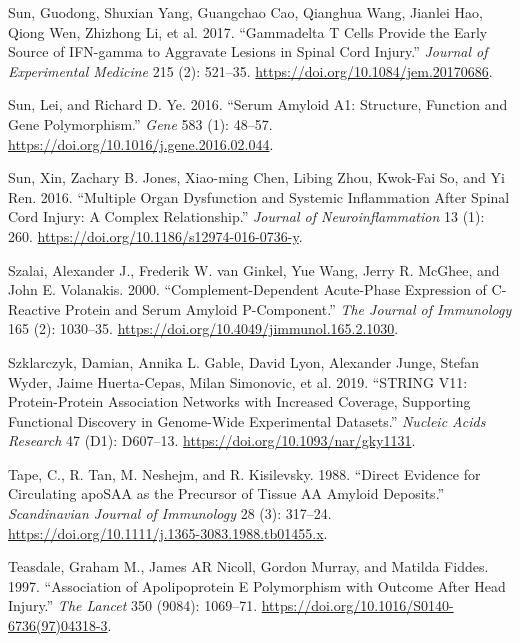 \documentclass[9pt,lineno]{elife}
\newlength{\cslhangindent}
\newlength{\cslentryspacingunit} %
\newenvironment{CSLReferences}[2] %
 {%
  \setlength{\parindent}{0pt}
  \ifodd #1
  \let\oldpar\par
  \def\par{\hangindent=\cslhangindent\oldpar}
  \fi
  \setlength{\parskip}{#2\cslentryspacingunit}
 }%
 {}
\begin{document}
\begin{landscape}
\begin{landscape}
\begin{landscape}
\begin{landscape}
\begin{CSLReferences}{1}{0}
\leavevmode{}%
Sun, Guodong, Shuxian Yang, Guangchao Cao, Qianghua Wang, Jianlei Hao, Qiong Wen, Zhizhong Li, et al. 2017. {``Gammadelta {T} Cells Provide the Early Source of {IFN-gamma} to Aggravate Lesions in Spinal Cord Injury.''} \emph{Journal of Experimental Medicine} 215 (2): 521--35. \url{https://doi.org/10.1084/jem.20170686}.

\leavevmode{}%
Sun, Lei, and Richard D. Ye. 2016. {``Serum Amyloid {A1}: {Structure}, Function and Gene Polymorphism.''} \emph{Gene} 583 (1): 48--57. \url{https://doi.org/10.1016/j.gene.2016.02.044}.

\leavevmode{}%
Sun, Xin, Zachary B. Jones, Xiao-ming Chen, Libing Zhou, Kwok-Fai So, and Yi Ren. 2016. {``Multiple Organ Dysfunction and Systemic Inflammation After Spinal Cord Injury: A Complex Relationship.''} \emph{Journal of Neuroinflammation} 13 (1): 260. \url{https://doi.org/10.1186/s12974-016-0736-y}.

\leavevmode{}%
Szalai, Alexander J., Frederik W. van Ginkel, Yue Wang, Jerry R. McGhee, and John E. Volanakis. 2000. {``Complement-{Dependent Acute-Phase Expression} of {C-Reactive Protein} and {Serum Amyloid P-Component}.''} \emph{The Journal of Immunology} 165 (2): 1030--35. \url{https://doi.org/10.4049/jimmunol.165.2.1030}.

\leavevmode{}%
Szklarczyk, Damian, Annika L. Gable, David Lyon, Alexander Junge, Stefan Wyder, Jaime Huerta-Cepas, Milan Simonovic, et al. 2019. {``{STRING} V11: Protein-Protein Association Networks with Increased Coverage, Supporting Functional Discovery in Genome-Wide Experimental Datasets.''} \emph{Nucleic Acids Research} 47 (D1): D607--13. \url{https://doi.org/10.1093/nar/gky1131}.

\leavevmode{}%
Tape, C., R. Tan, M. Neshejm, and R. Kisilevsky. 1988. {``Direct {Evidence} for {Circulating apoSAA} as the {Precursor} of {Tissue AA Amyloid Deposits}.''} \emph{Scandinavian Journal of Immunology} 28 (3): 317--24. \url{https://doi.org/10.1111/j.1365-3083.1988.tb01455.x}.

\leavevmode{}%
Teasdale, Graham M., James AR Nicoll, Gordon Murray, and Matilda Fiddes. 1997. {``Association of Apolipoprotein {E} Polymorphism with Outcome After Head Injury.''} \emph{The Lancet} 350 (9084): 1069--71. \url{https://doi.org/10.1016/S0140-6736(97)04318-3}.


\end{CSLReferences}
\end{landscape}
\end{landscape}
\end{landscape}
\end{landscape}
\end{document}
